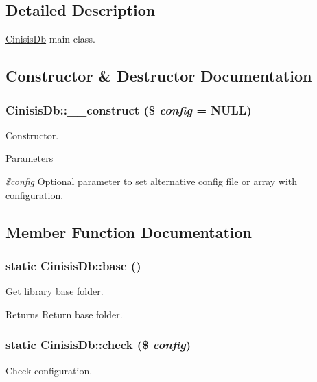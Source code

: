 \subsection{Detailed Description}
\hyperlink{classCinisisDb}{CinisisDb} main class. 

\subsection{Constructor \& Destructor Documentation}
\hypertarget{classCinisisDb_a0693dfb4a5bb8b039f3c7e7848dc1861}{
\subsubsection[{\_\-\_\-construct}]{\setlength{\rightskip}{0pt plus 5cm}CinisisDb::\_\-\_\-construct (\$ {\em config} = {\ttfamily NULL})}}
\label{classCinisisDb_a0693dfb4a5bb8b039f3c7e7848dc1861}
Constructor.


\begin{DoxyParams}{Parameters}
\item[{\em \$config}]Optional parameter to set alternative config file or array with configuration. \end{DoxyParams}


\subsection{Member Function Documentation}
\hypertarget{classCinisisDb_ab44fe0ebdf6a954bc02d50bc7bcc3464}{
\subsubsection[{base}]{\setlength{\rightskip}{0pt plus 5cm}static CinisisDb::base ()}}
\label{classCinisisDb_ab44fe0ebdf6a954bc02d50bc7bcc3464}
Get library base folder.

\begin{DoxyReturn}{Returns}
Return base folder. 
\end{DoxyReturn}
\hypertarget{classCinisisDb_ad1691843692ee6e9461e5bcb692263c8}{
\subsubsection[{check}]{\setlength{\rightskip}{0pt plus 5cm}static CinisisDb::check (\$ {\em config})}}
\label{classCinisisDb_ad1691843692ee6e9461e5bcb692263c8}
Check configuration.


